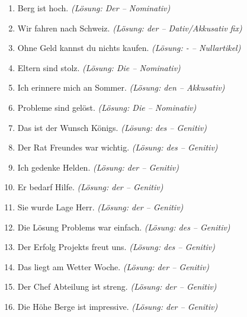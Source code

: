 \begin{enumerate}[label=\textbf{Aufgabe \arabic*}.]
    \item \underline{\hspace{1.5cm}} Berg ist hoch. \quad \textit{(Lösung: Der -- Nominativ)}
    \item Wir fahren nach \underline{\hspace{1.5cm}} Schweiz. \quad \textit{(Lösung: der -- Dativ/Akkusativ fix)}
    \item Ohne \underline{\hspace{1.5cm}} Geld kannst du nichts kaufen. \quad \textit{(Lösung: - -- Nullartikel)}
    \item \underline{\hspace{1.5cm}} Eltern sind stolz. \quad \textit{(Lösung: Die -- Nominativ)}
    \item Ich erinnere mich an \underline{\hspace{1.5cm}} Sommer. \quad \textit{(Lösung: den -- Akkusativ)}
    \item \underline{\hspace{1.5cm}} Probleme sind gelöst. \quad \textit{(Lösung: Die -- Nominativ)}
    \item Das ist der Wunsch \underline{\hspace{1.5cm}} Königs. \quad \textit{(Lösung: des -- Genitiv)}
    \item Der Rat \underline{\hspace{1.5cm}} Freundes war wichtig. \quad \textit{(Lösung: des -- Genitiv)}
    \item Ich gedenke \underline{\hspace{1.5cm}} Helden. \quad \textit{(Lösung: der -- Genitiv)}
    \item Er bedarf \underline{\hspace{1.5cm}} Hilfe. \quad \textit{(Lösung: der -- Genitiv)}
    \item Sie wurde \underline{\hspace{1.5cm}} Lage Herr. \quad \textit{(Lösung: der -- Genitiv)}
    \item Die Lösung \underline{\hspace{1.5cm}} Problems war einfach. \quad \textit{(Lösung: des -- Genitiv)}
    \item Der Erfolg \underline{\hspace{1.5cm}} Projekts freut uns. \quad \textit{(Lösung: des -- Genitiv)}
    \item Das liegt am Wetter \underline{\hspace{1.5cm}} Woche. \quad \textit{(Lösung: der -- Genitiv)}
    \item Der Chef \underline{\hspace{1.5cm}} Abteilung ist streng. \quad \textit{(Lösung: der -- Genitiv)}
    \item Die Höhe \underline{\hspace{1.5cm}} Berge ist impressive. \quad \textit{(Lösung: der -- Genitiv)}
\end{enumerate}


